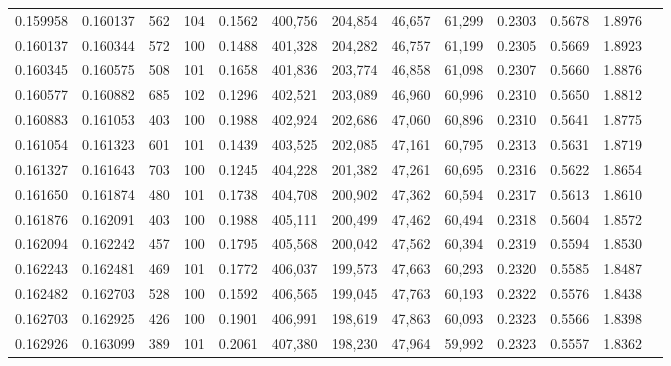 \begin{tabular}{rrrrrrrrrrrrr}
0.159958 & 0.160137 &   562 & 104 &                                     0.1562 & 400,756 & 204,854 &  46,657 &  61,299 & 0.2303 & 0.5678 & 1.8976 \\
0.160137 & 0.160344 &   572 & 100 &                                     0.1488 & 401,328 & 204,282 &  46,757 &  61,199 & 0.2305 & 0.5669 & 1.8923 \\
0.160345 & 0.160575 &   508 & 101 &                                     0.1658 & 401,836 & 203,774 &  46,858 &  61,098 & 0.2307 & 0.5660 & 1.8876 \\
0.160577 & 0.160882 &   685 & 102 &                                     0.1296 & 402,521 & 203,089 &  46,960 &  60,996 & 0.2310 & 0.5650 & 1.8812 \\
0.160883 & 0.161053 &   403 & 100 &                                     0.1988 & 402,924 & 202,686 &  47,060 &  60,896 & 0.2310 & 0.5641 & 1.8775 \\
0.161054 & 0.161323 &   601 & 101 &                                     0.1439 & 403,525 & 202,085 &  47,161 &  60,795 & 0.2313 & 0.5631 & 1.8719 \\
0.161327 & 0.161643 &   703 & 100 &                                     0.1245 & 404,228 & 201,382 &  47,261 &  60,695 & 0.2316 & 0.5622 & 1.8654 \\
0.161650 & 0.161874 &   480 & 101 &                                     0.1738 & 404,708 & 200,902 &  47,362 &  60,594 & 0.2317 & 0.5613 & 1.8610 \\
0.161876 & 0.162091 &   403 & 100 &                                     0.1988 & 405,111 & 200,499 &  47,462 &  60,494 & 0.2318 & 0.5604 & 1.8572 \\
0.162094 & 0.162242 &   457 & 100 &                                     0.1795 & 405,568 & 200,042 &  47,562 &  60,394 & 0.2319 & 0.5594 & 1.8530 \\
0.162243 & 0.162481 &   469 & 101 &                                     0.1772 & 406,037 & 199,573 &  47,663 &  60,293 & 0.2320 & 0.5585 & 1.8487 \\
0.162482 & 0.162703 &   528 & 100 &                                     0.1592 & 406,565 & 199,045 &  47,763 &  60,193 & 0.2322 & 0.5576 & 1.8438 \\
0.162703 & 0.162925 &   426 & 100 &                                     0.1901 & 406,991 & 198,619 &  47,863 &  60,093 & 0.2323 & 0.5566 & 1.8398 \\
0.162926 & 0.163099 &   389 & 101 &                                     0.2061 & 407,380 & 198,230 &  47,964 &  59,992 & 0.2323 & 0.5557 & 1.8362 \\

\end{tabular}
